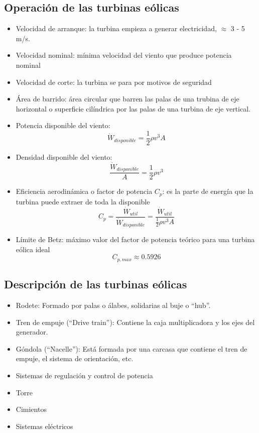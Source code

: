 \subsection{Operación de las turbinas eólicas}
\begin{itemize}
    \item Velocidad de arranque: la turbina empieza a generar electricidad, $\approx$ 3 - 5 m/s.
    \item Velocidad nominal: mínima velocidad del viento que produce potencia nominal
    \item Velocidad de corte: la turbina se para por motivos de seguridad
    \item Área de barrido: área circular que barren las palas de una trubina de eje horizontal o superficie cilíndrica por las palas de una turbina de eje vertical.
    \item Potencia disponible del viento:
    \[ \dot{W}_{disponible} = \frac{1}{2} \rho v^3 A \]
    \item Densidad disponible del viento:
    \[ \frac{\dot{W}_{disponible}}{A} = \frac{1}{2} \rho v^3 \]
    \item Eficiencia aerodinámica o factor de potencia $C_p$: es la parte de energía que la turbina puede extraer de toda la disponible
    \[ C_p = \frac{\dot{W}_{util}}{\dot{W}_{disponible}} = \frac{\dot{W}_{util}}{\frac{1}{2} \rho v^3 A } \]
    \item Límite de Betz: máximo valor del factor de potencia teórico para una turbina eólica ideal
    \[ C_{p, max} \approx 0.5926\]
\end{itemize}

\subsection{Descripción de las turbinas eólicas}
\begin{itemize}
    \item Rodete: Formado por palas o álabes, solidarias al buje o ``hub''.
    \item Tren de empuje (``Drive train''): Contiene la caja multiplicadora y los ejes del generador.
    \item Góndola (``Nacelle''): Está formada por una carcasa que contiene el tren de empuje, el sistema de orientación, etc.
    \item Sistemas de regulación y control de potencia
    \item Torre
    \item Cimientos
    \item Sistemas eléctricos
\end{itemize}